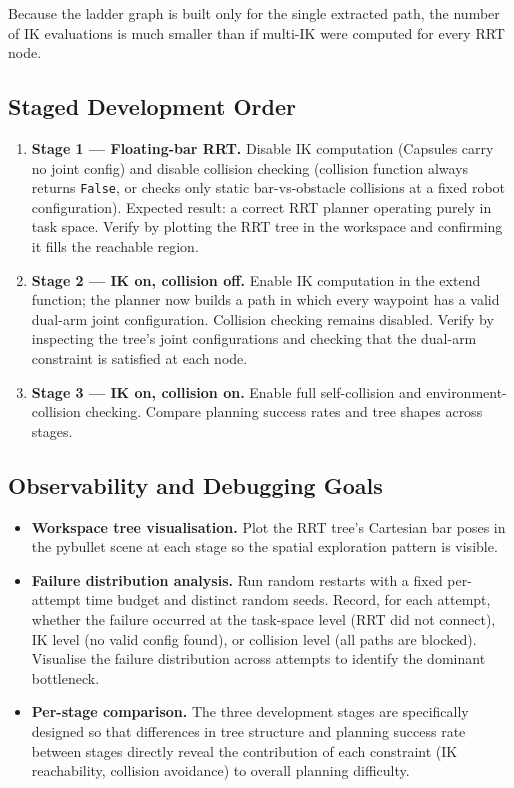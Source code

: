 \documentclass[11pt]{article}
\begin{document}
Because the ladder graph is built only for the single extracted path, the number of
IK evaluations is much smaller than if multi-IK were computed for every RRT node.

\subsection*{Staged Development Order}

\begin{enumerate}
  \item \textbf{Stage 1 — Floating-bar RRT.}
        Disable IK computation (Capsules carry no joint config) and disable collision
        checking (collision function always returns \texttt{False}, or checks only
        static bar-vs-obstacle collisions at a fixed robot configuration).
        Expected result: a correct RRT planner operating purely in task space.
        Verify by plotting the RRT tree in the workspace and confirming it fills the
        reachable region.

  \item \textbf{Stage 2 — IK on, collision off.}
        Enable IK computation in the extend function; the planner now builds a path
        in which every waypoint has a valid dual-arm joint configuration.
        Collision checking remains disabled.
        Verify by inspecting the tree's joint configurations and checking that the
        dual-arm constraint is satisfied at each node.

  \item \textbf{Stage 3 — IK on, collision on.}
        Enable full self-collision and environment-collision checking.
        Compare planning success rates and tree shapes across stages.
\end{enumerate}

\subsection*{Observability and Debugging Goals}

\begin{itemize}
  \item \textbf{Workspace tree visualisation.}
        Plot the RRT tree's Cartesian bar poses in the pybullet scene at each stage
        so the spatial exploration pattern is visible.
  \item \textbf{Failure distribution analysis.}
        Run random restarts with a fixed per-attempt time budget and distinct random
        seeds.  Record, for each attempt, whether the failure occurred at the
        task-space level (RRT did not connect), IK level (no valid config found), or
        collision level (all paths are blocked).  Visualise the failure distribution
        across attempts to identify the dominant bottleneck.
  \item \textbf{Per-stage comparison.}
        The three development stages are specifically designed so that differences in
        tree structure and planning success rate between stages directly reveal the
        contribution of each constraint (IK reachability, collision avoidance) to
        overall planning difficulty.
\end{itemize}
\end{document}
